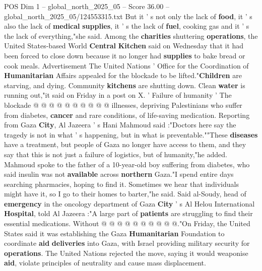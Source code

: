 \begin{textsample}{POS Dim 1 – global\_north\_2025\_05 – Score 36.00 – global\_north\_2025\_05/124553315.txt}
But it ' s not only the lack of \textbf{food}, it ' s also the lack of \textbf{medical} \textbf{supplies}, it ' s the lack of \textbf{fuel}, cooking gas and it ' s the lack of everything,"she said.
Among the \textbf{charities} shuttering \textbf{operations}, the United States-based World \textbf{Central} \textbf{Kitchen} said on Wednesday that it had been forced to close down because it no longer had \textbf{supplies} to bake bread or cook meals.
Advertisement The United Nations ' Office for the Coordination of \textbf{Humanitarian} Affairs appealed for the blockade to be lifted."\textbf{Children} are starving, and dying.
Community \textbf{kitchens} are shutting down.
Clean \textbf{water} is running out,"it said on Friday in a post on X. ' Failure of humanity ' The blockade @ @ @ @ @ @ @ @ @ @ illnesses, depriving Palestinians who suffer from diabetes, \textbf{cancer} and rare conditions, of life-saving medication.
Reporting from Gaza \textbf{City}, Al Jazeera ' s Hani Mahmoud said :"Doctors here say the tragedy is not in what ' s happening, but in what is preventable.""These \textbf{diseases} have a treatment, but people of Gaza no longer have access to them, and they say that this is not just a failure of logistics, but of humanity,"he added.
Mahmoud spoke to the father of a 10-year-old boy suffering from diabetes, who said insulin was not \textbf{available} across \textbf{northern} Gaza."I spend entire days searching pharmacies, hoping to find it.
Sometimes we hear that individuals might have it, so I go to their homes to barter,"he said.
Said al-Soudy, head of \textbf{emergency} in the oncology department of Gaza \textbf{City} ' s Al Helou International \textbf{Hospital}, told Al Jazeera :"A large part of \textbf{patients} are struggling to find their essential medications.
Without @ @ @ @ @ @ @ @ @ @."On Friday, the United States said it was establishing the Gaza \textbf{Humanitarian} Foundation to coordinate \textbf{aid} \textbf{deliveries} into Gaza, with Israel providing military security for \textbf{operations}.
The United Nations rejected the move, saying it would weaponise \textbf{aid}, violate principles of neutrality and cause mass displacement.

\end{textsample}
